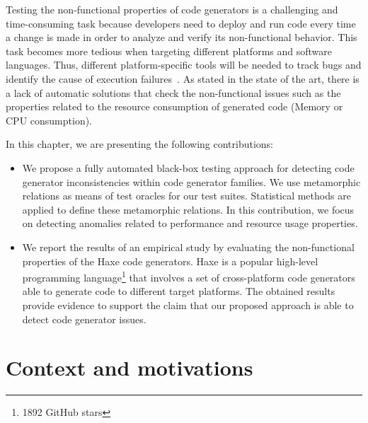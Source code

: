 Testing the non-functional properties of code generators is a challenging and time-consuming task because developers need to deploy and run code every time a change is made in order to analyze and verify its non-functional behavior.
This task becomes more tedious when targeting different platforms and software languages. Thus, different platform-specific tools will be needed to track bugs and identify the cause of execution failures~\cite{guana2014chaintracker,delgado2004taxonomy}. 
As stated in the state of the art, there is a lack of automatic solutions that check the non-functional issues such as the properties related to the resource consumption of generated code (Memory or CPU consumption).



In this chapter, we are presenting the following contributions:

\begin{itemize} 	
	
	\item We propose a fully automated black-box testing approach for detecting code generator inconsistencies within code generator families. We use metamorphic relations as means of test oracles for our test suites. 
	Statistical methods are applied to define these metamorphic relations.
	In this contribution, we focus on detecting anomalies related to performance and resource usage properties. 
	
	\item We report the results of an empirical study by evaluating the non-functional properties of the Haxe code generators. 
	Haxe is a popular high-level programming language\footnote{\num{1892} GitHub stars} that involves a set of cross-platform code generators able to generate code to different target platforms. The obtained results provide evidence to support the claim that our proposed approach is able to detect code generator issues.
	

	
\end{itemize}
\fi
\section{Context and motivations}
\label{sec:cg_Motivation}

